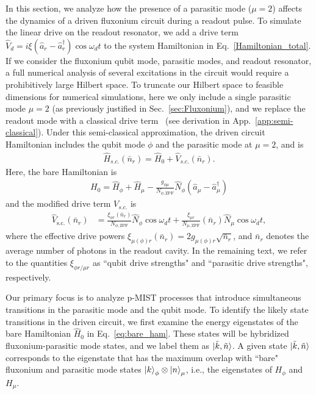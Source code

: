 \documentclass[%
reprint,
superscriptaddress,
 amsmath,amssymb,
 aps,
 prx,
longbibliography,
floatfix,
]{revtex4-2}
\begin{document}
In this section, we analyze how the presence of a parasitic mode ($\mu=2$) affects the dynamics of a driven fluxonium circuit during a readout pulse. To simulate the linear drive on the readout resonator, we add a drive term $\hat{V}_d=i\xi (\hat a_r-\hat a_r^\dagger)\cos{\omega_d t}$ to the system Hamiltonian in Eq.~\ref{Hamiltonian_total}. If we consider the fluxonium qubit mode, parasitic modes, and readout resonator, a full numerical analysis of several excitations in the circuit would require a prohibitively large Hilbert space. To truncate our Hilbert space to feasible dimensions for numerical simulations, here we only include a single parasitic mode $\mu=2$ (as previously justified in Sec.~\ref{sec:Fluxonium}), and we replace the readout mode with a classical drive term~\cite{cohen2023reminiscence,dumas2024unified,xiao2023diagrammatic} (see derivation in App.~\ref{app:semi-classical}). Under this semi-classical approximation, the driven circuit Hamiltonian includes the qubit mode $\phi$ and the parasitic mode at $\mu=2$, and is
\begin{align}
  \hat H_{s.c.}(\bar n_r)=\hat H_0+\hat V_{s.c.}(\bar n_r).  \label{eq:drive_Ham}
\end{align}
Here, the bare Hamiltonian is
\begin{align}
H_0=\hat H_\phi+\hat H_{\mu}-\frac{g_{\phi\mu}}{N_{\phi,\mathrm{ZPF}}} \hat N_\phi (\hat a_{\mu}-\hat a_{\mu}^\dagger) \label{eq:bare_ham} 
\end{align}
and the modified drive term $V_{s.c.}$ is
\begin{align}
    \hat V_\textrm{s.c.}(\bar n_r)&=\frac{\xi_{\phi r}(\bar n_r)}{N_{\phi,\mathrm{ZPF}}} \hat N_\phi\cos{\omega_d t}+\frac{\xi_{\mu r}}{N_{\mu, \mathrm{ZPF}}}(\bar n_r) \hat N_\mu\cos{\omega_d t}\label{eq:drive},
\end{align}
where the effective drive powers $\xi_{\mu(\phi) r}(\bar n_r)=2g_{\mu(\phi) r}\sqrt{\bar n_r}$, and $\bar n_r$ denotes the average number of photons in the readout cavity. In the remaining text, we refer to the quantities $\xi_{\phi r/\mu r}$ as  ``qubit drive strengths" and ``parasitic drive strengths", respectively. 

Our primary focus is to analyze p-MIST processes that introduce simultaneous transitions in the parasitic mode and the qubit mode. To identify the likely state transitions in the driven circuit, we first examine the energy eigenstates of the bare Hamiltonian $\hat{H}_0$ in Eq.~\ref{eq:bare_ham}. These states will be hybridized fluxonium-parasitic mode states, and we label them as $\ket{\tilde{k}, \tilde{n}}$.  A given state $\ket{\tilde{k}, \tilde{n}}$ corresponds to the eigenstate that has the maximum overlap with ``bare" fluxonium and parasitic mode states $\ket{k}_\phi\otimes\ket{n}_\mu$, i.e., the eigenstates of $H_{\phi}$ and $H_{\mu}$.
\end{document}
